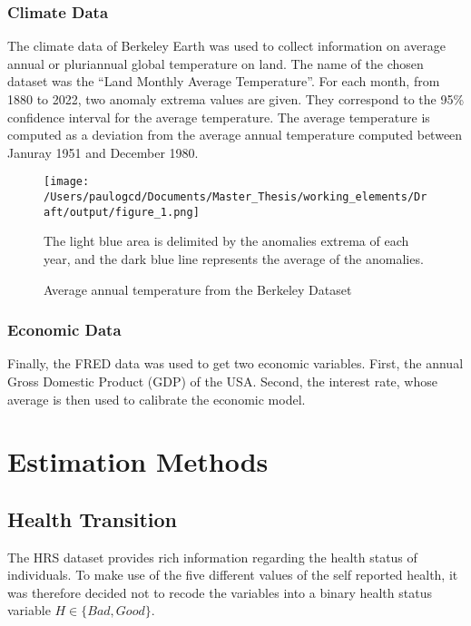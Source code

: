 \documentclass{article}
\begin{document}
\subsubsection{Climate Data}

The climate data of Berkeley Earth was used to collect information
on average annual or pluriannual global temperature on land.
The name of the chosen dataset was the ``Land Monthly Average Temperature''. 
For each month, from 1880 to 2022, two anomaly extrema values are given. 
They correspond to the 95\% confidence interval for the
average temperature. 
The average temperature is computed as a deviation from the average annual 
temperature computed between Januray 1951 and December 1980. 

\begin{figure}[H]
    \texttt{[image: /Users/paulogcd/Documents/Master\_Thesis/working\_elements/Draft/output/figure\_1.png]}
    \caption{Average annual temperature from the Berkeley Dataset}
    
    The light blue area is delimited by the anomalies extrema of each year, and
    the dark blue line represents the average of the anomalies.
\end{figure}

\subsubsection{Economic Data}

Finally, the FRED data was used to get two economic variables. 
First, the annual Gross Domestic Product (GDP) of the USA. 
Second, the interest rate, whose average is then used to calibrate the economic model.

\section{Estimation Methods}

\subsection{Health Transition}

The HRS dataset provides rich information regarding the health status of individuals. 
To make use of the five different values of the self reported health, it was therefore decided not to
recode the variables into a binary health status variable $H\in\{Bad, Good\}$. 
\end{document}
